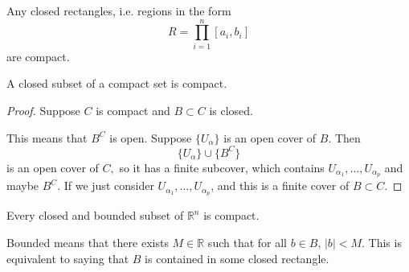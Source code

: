 \begin{itemize}
          \begin{corollary}
              Any closed rectangles, i.e. regions in the form
              \begin{equation}
                  R = \prod_{i=1}^n [a_i,b_i]
              \end{equation}
              are compact.
          \end{corollary}
          \begin{proposition}
              A closed subset of a compact set is compact.
          \end{proposition}
          \begin{proof}
              Suppose $C$ is compact and $B \subset C$ is closed.
              
              This means that $B^C$ is open. Suppose $\{U_\alpha\}$ is an open cover of $B$. Then
              \begin{equation}
                  \{U_\alpha\} \cup \{B^C\}
              \end{equation} 
              is an open cover of $C,$ so it has a finite subcover, which contains $U_{\alpha_1},\dots,U_{\alpha_p}$ and maybe $B^C$. If we just consider $U_{\alpha_1},\dots,U_{\alpha_p}$, and this is a finite cover of $B\subset C$.
          \end{proof}
          \begin{corollary}
              Every closed and bounded subset of $\mathbb{R}^n$ is compact.
          \end{corollary}
          \begin{definition}
              Bounded means that there exists $M\in \mathbb{R}$ such that for all $b\in B$, $|b|<M$. This is equivalent to saying that $B$ is contained in some closed rectangle.
          \end{definition}
\end{itemize}